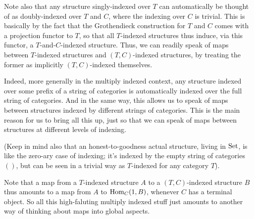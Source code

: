 
Note also that any structure singly-indexed over $T$ can automatically be thought of as doubly-indexed over $T$ and $C$, where the indexing over $C$ is trivial. This is basically by the fact that the Grothendieck construction for $T$ and $C$ comes with a projection functor to $T$, so that all $T$-indexed structures thus induce, via this functor, a $T$-and-$C$-indexed structure. Thus, we can readily speak of maps between $T$-indexed structures and $(T, C)$-indexed structures, by treating the former as implicitly $(T, C)$-indexed themselves.

Indeed, more generally in the multiply indexed context, any structure indexed over some prefix of a string of categories is automatically indexed over the full string of categories. And in the same way, this allows us to speak of maps between structures indexed by different strings of categories. This is the main reason for us to bring all this up, just so that we can speak of maps between structures at different levels of indexing.

(Keep in mind also that an honest-to-goodness actual structure, living in $\mathrm{Set}$, is like the zero-ary case of indexing; it's indexed by the empty string of categories $()$, but can be seen in a trivial way as $T$-indexed for any category $T$).

Note that a map from a $T$-indexed structure $A$ to a $(T, C)$-indexed structure $B$ thus amounts to a map from $A$ to $\operatorname{Hom}_C(1, B)$, whenever $C$ has a terminal object. So all this high-faluting multiply indexed stuff just amounts to another way of thinking about maps into global aspects.

